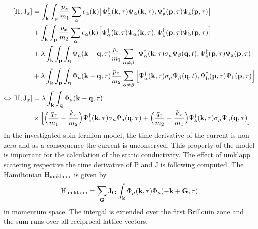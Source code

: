 \begin{align}
	\comm{\mt{H}}{\mt{J}_{x}} &=
		\int_{\vb{k}} \int_{\vb{p}}
		\frac{p_{x}}{m_{1}}
		\sum\limits_{\alpha} 
		\epsilon_{\alpha}(\vb{k})
		\comm{
			\Psi_{\alpha}^{\dag}(\vb{k},\tau) 
			\Psi_{\alpha}(\vb{k},\tau)
		}{	
			\Psi_{\mt{a}}^{\dag}(\vb{p},\tau)	
			\Psi_{\mt{a}}(\vb{p},\tau)
		}
		\notag \\&
		+
		\int_{\vb{k}} \int_{\vb{p}}
		\frac{p_{x}}{m_{2}}
		\sum\limits_{\alpha} 
		\epsilon_{\alpha}(\vb{k})
		\comm{
			\Psi_{\alpha}^{\dag}(\vb{k},\tau) 
			\Psi_{\alpha}(\vb{k},\tau)
		}{	
			\Psi_{\mt{b}}^{\dag}(\vb{p},\tau)
			\Psi_{\mt{b}}(\vb{p},\tau)
		}
		\notag \\&
		+
		\lambda
		\int_{\vb{k}} \int_{\vb{p}} \int_{\vb{q}}
		\Phi_{\mu}(\vb{k}-\vb{q},\tau)
		\frac{p_{x}}{m_{1}}
		\sum\limits_{\alpha\neq\beta}
		\comm{
			\Psi_{\alpha}^{\dag}(\vb{k},\tau) 
			\sigma_{\mu} 
			\Psi_{\beta}(\vb{q},t)
		}{
			\Psi_{\mt{a}}^{\dag}(\vb{p},\tau)	
			\Psi_{\mt{a}}(\vb{p},\tau)
		}
		\notag \\&
		+
		\lambda
		\int_{\vb{k}} \int_{\vb{p}} \int_{\vb{q}}
		\Phi_{\mu}(\vb{k}-\vb{q},\tau)
		\frac{p_{x}}{m_{2}}
		\sum\limits_{\alpha\neq\beta}
		\comm{
			\Psi_{\alpha}^{\dag}(\vb{k},\tau) 
			\sigma_{\mu} 
			\Psi_{\beta}(\vb{q},t)
		}{
			\Psi_{\mt{b}}^{\dag}(\vb{p},\tau)
			\Psi_{\mt{b}}(\vb{p},\tau)
		}
	\notag \\
	\Leftrightarrow \comm{\mt{H}}{\mt{J}_{x}} &=
		\lambda
		\int_{\vb{k}} \int_{\vb{q}}
		\Phi_{\mu}(\vb{k}-\vb{q},\tau) 
		\notag \\&
		\times \Big[
			\Big(\frac{q_{x}}{m_{1}} - \frac{k_{x}}{m_{2}}\Big)
			\Psi_{\mt{b}}^{\dag}(\vb{k},\tau) \sigma_{\mu} \Psi_{\mt{a}}(\vb{q},\tau)
			+
			\Big(\frac{q_{x}}{m_{2}} - \frac{k_{x}}{m_{1}}\Big)
			\Psi_{\mt{a}}^{\dag}(\vb{k},\tau) \sigma_{\mu} \Psi_{\mt{b}}(\vb{q},\tau)
		\Big]
\end{align}
%
In the investigated spin-fermion-model, the time derivative of the current is non-zero and as a consequence the current is unconserved.
This property of the model is important for the calculation of the static conductivity.
The effect of umklapp scatering respective the time derivative of P and J is following computed.
The Hamiltonian $\mathrm{H}_{\mathrm{umklapp}}$ is given by
%
\begin{align}
	\mathrm{H}_{\mathrm{umklapp}}= \sum\limits_{\vb{G}} \mathrm{J}_{\vb{G}} \int_{\vb{k}} \Phi_{\mu}(\vb{k},\tau) \Phi_{\mu}(-\vb{k}+\vb{G},\tau)
\end{align}
%
in momentum space.
The intergal is extended over the first Brillouin zone and the sum runs over all reciprocal lattice vectors.
